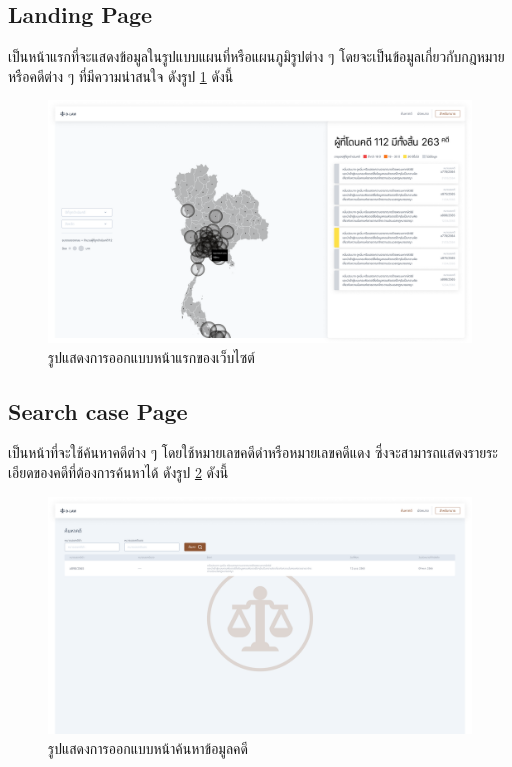\documentclass[12pt,oneside,openright,a4paper]{cpe-thai-project}
\begin{document}
\subsection{Landing Page}
\hspace*{1cm} เป็นหน้าแรกที่จะแสดงข้อมูลในรูปแบบแผนที่หรือแผนภูมิรูปต่าง ๆ โดยจะเป็นข้อมูลเกี่ยวกับกฎหมายหรือคดีต่าง ๆ ที่มีความน่าสนใจ ดังรูป \ref{fig:landing-page} ดังนี้
\begin{figure}[!h]\centering
  \includegraphics[width=13cm]{./assets/userinterface/landing-page.png}
  \caption{รูปแสดงการออกแบบหน้าแรกของเว็บไซต์}\label{fig:landing-page}
\end{figure}

\subsection{Search case Page}
\hspace*{1cm} เป็นหน้าที่จะใช้ค้นหาคดีต่าง ๆ โดยใช้หมายเลขคดีดำหรือหมายเลขคดีแดง ซึ่งจะสามารถแสดงรายระเอียดของคดีที่ต้องการค้นหาได้ ดังรูป \ref{fig:search-case} ดังนี้ 
\begin{figure}[!h]\centering
  \includegraphics[width=13cm]{./assets/userinterface/search-case.png}
  \caption{รูปแสดงการออกแบบหน้าค้นหาข้อมูลคดี}\label{fig:search-case}
\end{figure}
\end{document}

